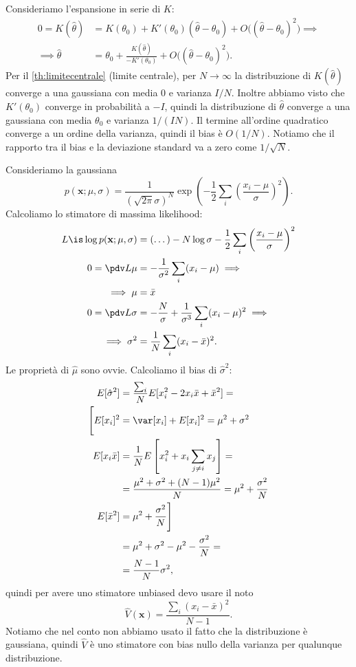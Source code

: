 Consideriamo l'espansione in serie di $K$:
\begin{align*}
	0 = K(\hat\theta)
	&= K(\theta_0) + K'(\theta_0)(\hat\theta-\theta_0) + O\big((\hat\theta-\theta_0)^2\big) \implies \\
	\implies \hat\theta
	&= \theta_0 + \frac{K(\hat\theta)}{-K'(\theta_0)} + O\big((\hat\theta-\theta_0)^2\big).
\end{align*}
Per il \autoref{th:limitecentrale} (limite centrale),
per $N\to\infty$
la distribuzione di $K(\hat\theta)$ converge a una gaussiana
con media 0 e varianza $I/N$.
Inoltre abbiamo visto che $K'(\theta_0)$ converge in probabilità a $-I$,
quindi la distribuzione di $\hat\theta$ converge a una gaussiana
con media $\theta_0$ e varianza $1/(IN)$.
Il termine all'ordine quadratico converge a un ordine della varianza,
quindi il bias è $O(1/N)$.
Notiamo che il rapporto tra il bias e la deviazione standard va a zero come $1/\sqrt{N}$.

\begin{example}
	Consideriamo la gaussiana
	\begin{equation*}
		p(\mathbf x;\mu,\sigma)
		= \frac1{(\sqrt{2\pi}\sigma)^N} \exp \left( -\frac12\sum_i\left(\frac{x_i-\mu}\sigma\right)^2 \right).
	\end{equation*}
	Calcoliamo lo stimatore di massima likelihood:
	\begin{align*}
		L \is \log p(\mathbf x;\mu,\sigma)
		&= (\dots) - N\log\sigma - \frac12 \sum_i \left( \frac{x_i-\mu}\sigma \right)^2 \\
		0 = \pdv L\mu
		&= -\frac1{\sigma^2}\sum_i (x_i-\mu) \implies \\
		\implies \mu
		&= \bar x \\
		0 = \pdv L\sigma
		&= -\frac N\sigma + \frac1{\sigma^3}\sum_i (x_i-\mu)^2 \implies \\
		\implies \sigma^2
		&= \frac1N \sum_i (x_i-\bar x)^2.
	\end{align*}
	Le proprietà di $\hat\mu$ sono ovvie.
	Calcoliamo il bias di $\hat\sigma^2$:
	\begin{align*}
		E[\hat\sigma^2]
		&= \frac{\sum_i}N E[x_i^2 - 2x_i\bar x + \bar x^2] = \\
		\Bigg[ E[x_i]^2
		&= \var[x_i] + E[x_i]^2
		= \mu^2 + \sigma^2 \\
		E[x_i\bar x]
		&= \frac 1N E \left[ x_i^2 + x_i \sum_{j\neq i} x_j \right] = \\
		&= \frac{\mu^2 + \sigma^2 + (N-1)\mu^2}N
		= \mu^2 + \frac{\sigma^2}N \\
		E[\bar x^2]
		&= \mu^2 + \frac{\sigma^2}N \Bigg] \\
		&= \mu^2 + \sigma^2 - \mu^2 - \frac{\sigma^2}N = \\
		&= \frac{N-1}N \sigma^2,
	\end{align*}
	quindi per avere uno stimatore unbiased devo usare il noto
	\begin{equation*}
		\hat V(\mathbf x)
		= \frac{\sum_i (x_i-\bar x)^2}{N-1}.
	\end{equation*}
	Notiamo che nel conto non abbiamo usato il fatto che la distribuzione è gaussiana,
	quindi $\hat V$ è uno stimatore con bias nullo della varianza per qualunque distribuzione.
\end{example}

